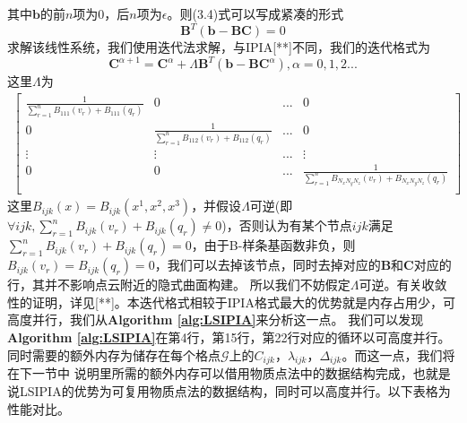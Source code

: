 其中$\mathbf{b}$的前$n$项为$0$，后$n$项为$\epsilon$。则(3.4)式可以写成紧凑的形式
\begin{equation}
    \mathbf{B}^T ( \mathbf{b} - \mathbf{B} \mathbf{C}) = 0    
\end{equation}
求解该线性系统，我们使用迭代法求解，与IPIA[**]不同，我们的迭代格式为
\begin{equation}
\mathbf{C}^{\alpha + 1} = \mathbf{C}^{\alpha} + \Lambda \mathbf{B}^T(\mathbf{b} - \mathbf{B}\mathbf{C}^{\alpha}) , \alpha = 0,1,2...
\end{equation}
这里$\Lambda$为
\begin{equation}
    \begin{split}
        \begin{bmatrix}
            \frac{1}{\sum_{r = 1}^n B_{111}(v_r) +B_{111}(q_r)} & 0 & ... & 0\\
            0 & \frac{1}{\sum_{r = 1}^n B_{112}(v_r) +B_{112}(q_r)} & ... & 0\\
            \vdots & \vdots & ... & \vdots \\
            0 & 0 & ... & \frac{1}{\sum_{r = 1}^n B_{N_xN_yN_z}(v_r) +B_{N_xN_yN_z}(q_r)} \\
        \end{bmatrix}
    \end{split}
\end{equation}
这里$B_{ijk}(x) = B_{ijk}(x^1,x^2,x^3)$，并假设$\Lambda$可逆(即$\forall ijk ,\sum_{r = 1}^n B_{ijk}(v_r) +B_{ijk}(q_r) \neq 0$)，否则认为有某个节点$ijk$满足$\sum_{r = 1}^n B_{ijk}(v_r) +B_{ijk}(q_r) = 0$，由于B-样条基函数非负，则$B_{ijk}(v_r) = B_{ijk}(q_r) = 0$，我们可以去掉该节点，同时去掉对应的$\mathbf{B}$和$\mathbf{C}$对应的行，其并不影响点云附近的隐式曲面构建。
所以我们不妨假定$\Lambda$可逆。有关收敛性的证明，详见[**]。本迭代格式相较于IPIA格式最大的优势就是内存占用少，可高度并行，我们从\textbf{Algorithm \ref{alg:LSIPIA}}来分析这一点。
我们可以发现\textbf{Algorithm \ref{alg:LSIPIA}}在第4行，第15行，第22行对应的循环以可高度并行。同时需要的额外内存为储存在每个格点$\mathcal{G}$上的$C_{ijk}$，$\lambda_{ijk}$，$\Delta_{ijk}$。而这一点，我们将在下一节中
说明里所需的额外内存可以借用物质点法中的数据结构完成，也就是说LSIPIA的优势为可复用物质点法的数据结构，同时可以高度并行。以下表格为性能对比。


